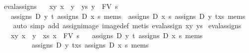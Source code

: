 \begin{isabellebody}
\endisatagproof
{\isafoldproof}%
%
\isadelimproof
\isanewline
%
\endisadelimproof
\isanewline
{}\isamarkupfalse%
\ eval{}assigns{}{}\isanewline
\ \ \ xy{}\ {}x\ {}\ y{}\ \ ys{}\ {}y\ {}\ FV\ s{}\isanewline
\ \ \ {}assigns\ D\ y\ t\ {}assigns\ D\ x\ s\ mems{}\ {}\ assigns\ D\ x\ s\ {}assigns\ D\ y\ {}t{}x{}s{}{}\ mems{}{}\isanewline
%
\isadelimproof
\ \ %
\endisadelimproof
%
\isatagproof
{}\isamarkupfalse%
\ {}auto\ simp\ add{}\ assign{}image\ image{}def{}\ {}metis\ eval{}assign{}\ xy\ ys{}{}{}%
\endisatagproof
{\isafoldproof}%
%
\isadelimproof
\isanewline
%
\endisadelimproof
\isanewline
{}\isamarkupfalse%
\ eval{}assigns{}{}\isanewline
\ \ \ xy{}\ {}x\ {}\ y{}\ \ xs{}\ {}x\ {}\ FV\ s{}\isanewline
\ \ \ {}assigns\ D\ y\ t\ {}assigns\ D\ x\ s\ mems{}\ {}\isanewline
\ \ \ \ \ \ \ \ \ assigns\ D\ y\ {}t{}x{}s{}{}\ {}assigns\ D\ x\ s\ mems{}{}\isanewline

\end{isabellebody}
